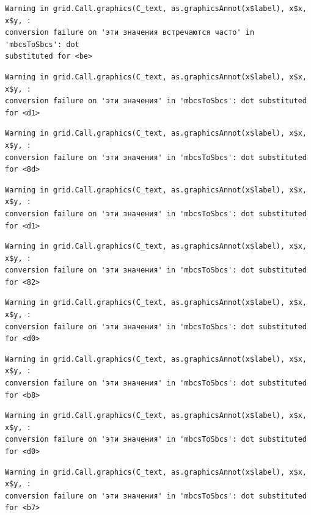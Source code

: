 \documentclass[
  letterpaper,
]{scrbook}
\theoremstyle{definition}
\theoremstyle{remark}
\begin{document}
\begin{verbatim}
Warning in grid.Call.graphics(C_text, as.graphicsAnnot(x$label), x$x, x$y, :
conversion failure on 'эти значения встречаются часто' in 'mbcsToSbcs': dot
substituted for <be>
\end{verbatim}

\begin{verbatim}
Warning in grid.Call.graphics(C_text, as.graphicsAnnot(x$label), x$x, x$y, :
conversion failure on 'эти значения' in 'mbcsToSbcs': dot substituted for <d1>
\end{verbatim}

\begin{verbatim}
Warning in grid.Call.graphics(C_text, as.graphicsAnnot(x$label), x$x, x$y, :
conversion failure on 'эти значения' in 'mbcsToSbcs': dot substituted for <8d>
\end{verbatim}

\begin{verbatim}
Warning in grid.Call.graphics(C_text, as.graphicsAnnot(x$label), x$x, x$y, :
conversion failure on 'эти значения' in 'mbcsToSbcs': dot substituted for <d1>
\end{verbatim}

\begin{verbatim}
Warning in grid.Call.graphics(C_text, as.graphicsAnnot(x$label), x$x, x$y, :
conversion failure on 'эти значения' in 'mbcsToSbcs': dot substituted for <82>
\end{verbatim}

\begin{verbatim}
Warning in grid.Call.graphics(C_text, as.graphicsAnnot(x$label), x$x, x$y, :
conversion failure on 'эти значения' in 'mbcsToSbcs': dot substituted for <d0>
\end{verbatim}

\begin{verbatim}
Warning in grid.Call.graphics(C_text, as.graphicsAnnot(x$label), x$x, x$y, :
conversion failure on 'эти значения' in 'mbcsToSbcs': dot substituted for <b8>
\end{verbatim}

\begin{verbatim}
Warning in grid.Call.graphics(C_text, as.graphicsAnnot(x$label), x$x, x$y, :
conversion failure on 'эти значения' in 'mbcsToSbcs': dot substituted for <d0>
\end{verbatim}

\begin{verbatim}
Warning in grid.Call.graphics(C_text, as.graphicsAnnot(x$label), x$x, x$y, :
conversion failure on 'эти значения' in 'mbcsToSbcs': dot substituted for <b7>
\end{verbatim}
\end{document}
